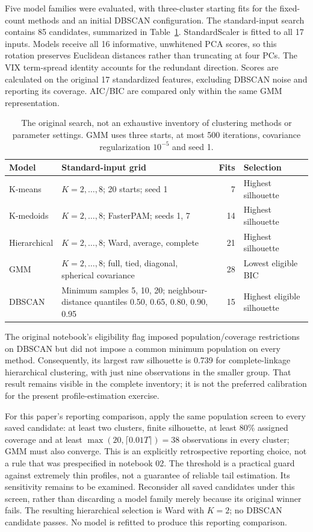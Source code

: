 \documentclass[11pt,a4paper]{article}
\begin{document}
Five model families were evaluated, with three-cluster starting fits for the fixed-count methods and an initial DBSCAN configuration. The standard-input search contains 85 candidates, summarized in Table~\ref{tab:original-grid}. StandardScaler is fitted to all 17 inputs. Models receive all 16 informative, unwhitened PCA scores, so this rotation preserves Euclidean distances rather than truncating at four PCs. The VIX term-spread identity accounts for the redundant direction. Scores are calculated on the original 17 standardized features, excluding DBSCAN noise and reporting its coverage. AIC/BIC are compared only within the same GMM representation.

\begin{table}[htbp]
\centering
\small
\begin{tabularx}{\textwidth}{@{}lXrl@{}}
\toprule
Model & Standard-input grid & Fits & Selection\\
\midrule
K-means & $K=2,\ldots,8$; 20 starts; seed 1 & 7 & Highest silhouette\\[3pt]
K-medoids & $K=2,\ldots,8$; FasterPAM; seeds 1, 7 & 14 & Highest silhouette\\[3pt]
Hierarchical & $K=2,\ldots,8$; Ward, average, complete & 21 & Highest silhouette\\[3pt]
GMM & $K=2,\ldots,8$; full, tied, diagonal, spherical covariance & 28 & Lowest eligible BIC\\[3pt]
DBSCAN & Minimum samples 5, 10, 20; neighbour-distance quantiles 0.50, 0.65, 0.80, 0.90, 0.95 & 15 & Highest eligible silhouette\\
\bottomrule
\end{tabularx}
\caption{The original search, not an exhaustive inventory of clustering methods or parameter settings. GMM uses three starts, at most 500 iterations, covariance regularization $10^{-5}$ and seed 1.}
\label{tab:original-grid}
\end{table}

The original notebook's eligibility flag imposed population/coverage restrictions on DBSCAN but did not impose a common minimum population on every method. Consequently, its largest raw silhouette is 0.739 for complete-linkage hierarchical clustering, with just nine observations in the smaller group. That result remains visible in the complete inventory; it is not the preferred calibration for the present profile-estimation exercise.

For this paper's reporting comparison, apply the same population screen to every saved candidate: at least two clusters, finite silhouette, at least 80\% assigned coverage and at least $\max(20,\lceil0.01T\rceil)=38$ observations in every cluster; GMM must also converge. This is an explicitly retrospective reporting choice, not a rule that was prespecified in notebook 02. The threshold is a practical guard against extremely thin profiles, not a guarantee of reliable tail estimation. Its sensitivity remains to be examined. Reconsider all saved candidates under this screen, rather than discarding a model family merely because its original winner fails. The resulting hierarchical selection is Ward with $K=2$; no DBSCAN candidate passes. No model is refitted to produce this reporting comparison.
\end{document}

